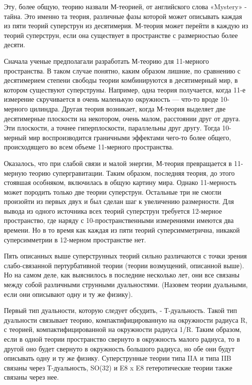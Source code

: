 Эту, более общую, теорию назвали М-теорией, от английского слова «Mystery» - тайна. Это именно та теория, различные фазы которой может описывать каждая из пяти теорий суперструн из десятимерия. М-теория может перейти в каждую из теорий суперструн, если она существует в пространстве с размерностью более десяти.

Сначала ученые предполагали разработать М-теорию для 11-мерного пространства. В таком случае понятно, каким образом лишние, по сравнению с десятимерием степени свободы теории комбинируются в десятимерный мир, в котором существуют суперструны. Например, одна теория получается, когда 11-е измерение скручивается в очень маленькую окружность — что-то вроде 10-мерного цилиндра. Другая теория возникает, когда М-теория выделяет две десятимерные плоскости на некотором, очень малом, расстоянии друг от друга. Эти плоскости, а точнее гиперплоскости, параллельны друг другу. Тогда 10-мерный мир воспроизводится граничными эффектами чего-то более общего, происходящего во всем объеме 11-мерного пространства.

Оказалось, что при слабой связи и малой энергии, М-теория превращается в 11-мерную теорию супергравитации. Таким образом, последняя теория, до этого стоявшая особняком, включилась в общую картину мира. Однако 11-мерность может породить только две теории суперструн. Остальные три не смогли произойти из первых двух и был сделан шаг к увеличению размерности. Для вывода из одного источника всех теорий суперструн требуется 12-мерное пространство, где наряду с 10-пространственными измерениями имеются два времени. Но в то время как каждая из пяти теорий суперсимметрична, никакой суперсимметрии в 12-мерном пространстве нет.

Пять описанных выше суперструнных теорий сильно различаются с точки зрения слабо-связанной пертурбативной теории (теории возмущений, описанной выше). Но на самом деле, как выяснилось в последние несколько лет, они все связаны между собой различными струнными дуальностями. (Назовем теории дуальными, если они описывают одну и ту же физику). 

Первый тип дуальности, которую следует обсудить, - Т-дуальность. Такой тип дуальности связывает теорию, компактифицированную на окружности радиуса R, с теорией, компактифицированной на окружности радиуса 1/R. Таким образом, если в одной теории пространство свернуто в окружность малого радиуса, то в другой оно будет свернуто в окружность большого радиуса, но обе они будут описывать одну и ту же физику. Суперструнные теории типа IIA и типа IIB связаны через Т-дуальность, SO(32) и E8 x E8 гетеротические теории также связаны через нее.

